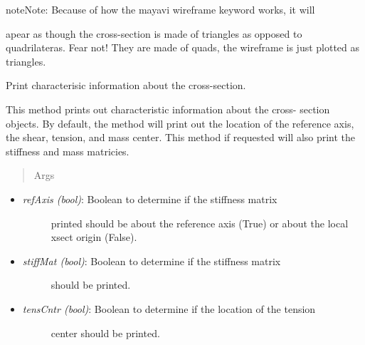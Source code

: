 \documentclass[letterpaper,10pt,english]{sphinxmanual}
\begin{document}
\begin{fulllineitems}
\begin{fulllineitems}
\begin{itemize}
\end{itemize}

\begin{notice}{note}{Note:}
Because of how the mayavi wireframe keyword works, it will
\end{notice}

apear as though the cross-section is made of triangles as opposed to
quadrilateras. Fear not! They are made of quads, the wireframe is just
plotted as triangles.

\end{fulllineitems}


\begin{fulllineitems}
\label{structures:AeroComBAT.Structures.XSect.printSummary}
Print characterisic information about the cross-section.

This method prints out characteristic information about the cross-
section objects. By default, the method will print out the location of
the reference axis, the shear, tension, and mass center. This method
if requested will also print the stiffness and mass matricies.
\begin{quote}\begin{description}
\item[{Args}] \leavevmode
\end{description}\end{quote}
\begin{itemize}
\item {} \begin{description}
\item[{\emph{refAxis (bool)}: Boolean to determine if the stiffness matrix}] \leavevmode
printed should be about the reference axis (True) or about the
local xsect origin (False).

\end{description}

\item {} \begin{description}
\item[{\emph{stiffMat (bool)}: Boolean to determine if the stiffness matrix}] \leavevmode
should be printed.

\end{description}

\item {} \begin{description}
\item[{\emph{tensCntr (bool)}: Boolean to determine if the location of the tension}] \leavevmode
center should be printed.


\end{description}
\end{itemize}
\end{fulllineitems}
\end{fulllineitems}
\end{document}
